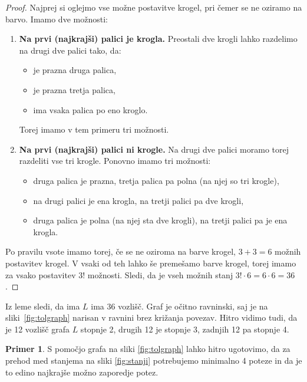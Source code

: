 \documentclass[12pt,a4paper]{amsart}
\theoremstyle{definition} %
\newtheorem{primer}[definicija]{Primer}
\theoremstyle{plain} %
\begin{document}
\begin{proof}
    Najprej si oglejmo vse možne postavitve krogel, pri čemer se ne oziramo na barvo.
    Imamo dve možnosti:
    \begin{enumerate}
        \item \textbf{Na prvi (najkrajši) palici je krogla.}
        Preostali dve krogli lahko razdelimo na drugi dve palici tako, da:
        \begin{itemize}[label={-}]
            \item je prazna druga palica,
            \item je prazna tretja palica,
            \item ima vsaka palica po eno kroglo.
        \end{itemize}
        Torej imamo v tem primeru tri možnosti.
        
        \item \textbf{Na prvi (najkrajši) palici ni krogle.}
        Na drugi dve palici moramo torej razdeliti vse tri krogle.
        Ponovno imamo tri možnosti:
        \begin{itemize}[label={-}]
            \item druga palica je prazna, tretja palica pa polna (na njej so tri krogle),
            \item na drugi palici je ena krogla, na tretji palici pa dve krogli,
            \item druga palica je polna (na njej sta dve krogli), na tretji palici pa je ena krogla.
        \end{itemize}
    \end{enumerate}
    Po pravilu vsote imamo torej, če se ne oziroma na barve krogel, $3+3=6$ možnih postavitev krogel.
    V vsaki od teh lahko še premešamo barve krogel, torej imamo za vsako postavitev $3!$ možnosti. Sledi, da je vseh možnih stanj $3! \cdot 6 = 6 \cdot 6 = 36$.\qedhere
\end{proof}

Iz leme sledi, da ima $L$ ima 36 vozlišč. Graf je očitno ravninski, saj je na sliki~\ref{fig:tolgraph} narisan v ravnini brez križanja povezav. Hitro vidimo tudi, da je 12 vozlišč grafa $L$ stopnje 2, drugih 12 je stopnje 3, zadnjih 12 pa stopnje 4.

\begin{primer}
    S pomočjo grafa na sliki \ref{fig:tolgraph} lahko hitro ugotovimo, da za prehod med stanjema na sliki \ref{fig:stanji} potrebujemo minimalno 4 poteze in da je to edino najkrajše možno zaporedje potez.
\end{primer}
\end{document}
